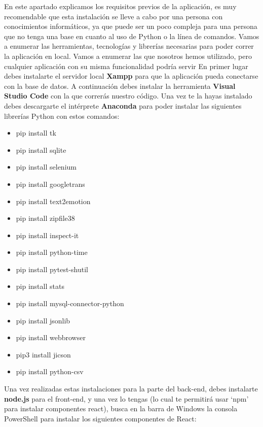 En este apartado explicamos los requisitos previos de la aplicación, es muy recomendable que esta instalación se lleve a cabo por una persona con conocimientos informáticos, ya que puede ser un poco compleja para una persona que no tenga una base en cuanto al uso de Python o la línea de comandos.
Vamos a enumerar las herramientas, tecnologías y librerías necesarias para poder correr la aplicación en local. Vamos a enumerar las que nosotros hemos utilizado, pero cualquier aplicación con su misma funcionalidad podría servir En primer lugar debes instalarte el servidor local  \textbf{Xampp} para que la aplicación pueda conectarse con la base de datos. A continuación debes instalar la herramienta \textbf{Visual Studio Code} con la que correrás nuestro código. Una vez te la hayas instalado debes descargarte el intérprete \textbf{Anaconda} para poder instalar las siguientes librerías Python con estos comandos:
\begin{itemize}
	\item pip install tk
	\item pip install sqlite
	\item pip install selenium
	\item pip install googletrans
	\item pip install text2emotion
	\item pip install zipfile38
	\item pip install inspect-it
	\item pip install python-time
	\item pip install pytest-shutil
	\item pip install stats
	\item pip install mysql-connector-python
	\item pip install jsonlib
	\item pip install webbrowser
	\item pip3 install jicson
	\item pip install python-csv
\end{itemize}
Una vez realizadas estas instalaciones para la parte del back-end, debes instalarte \textbf{node.js} para el front-end, y una vez lo tengas (lo cual te permitirá usar `npm' para instalar componentes react), busca en la barra de Windows la consola PowerShell para instalar los siguientes componentes de React:
